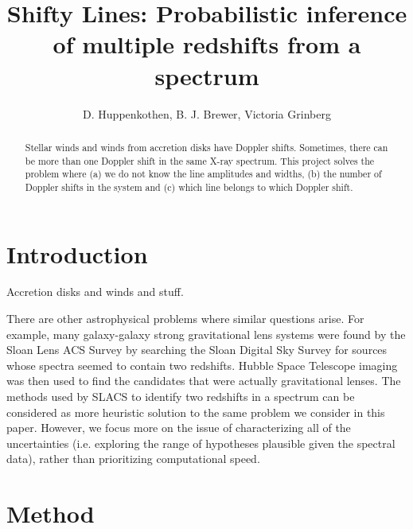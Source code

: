 \documentclass[12pt]{emulateapj}
\begin{document}
\title{Shifty Lines: Probabilistic inference of multiple redshifts from a spectrum}

\author{D. Huppenkothen, B. J. Brewer, Victoria Grinberg}
 


\begin{abstract}
Stellar winds and winds from accretion disks have Doppler shifts. Sometimes, there can be more than one Doppler shift in 
the same X-ray spectrum. This project solves the problem where (a) we do not know the line amplitudes and widths, (b) the 
number of Doppler shifts in the system and (c) which line belongs to which Doppler shift.

\end{abstract}


\section{Introduction}

Accretion disks and winds and stuff.

There are other astrophysical problems where similar questions arise. For
example, many galaxy-galaxy strong gravitational lens systems were
found by the Sloan Lens ACS Survey \citep[SLACS;][]{slacs0, slacs1} by searching
the Sloan Digital Sky Survey for sources whose spectra seemed to contain two
redshifts. Hubble Space Telescope imaging was then used to find the candidates
that were actually gravitational lenses.
The methods used by SLACS to identify two redshifts in a spectrum can be
considered as more heuristic solution to the same problem we consider in this
paper. However, we focus more on the issue of characterizing all of the
uncertainties (i.e. exploring the range of hypotheses plausible given the
spectral data), rather than prioritizing computational speed.

\section{Method}
\end{document}
